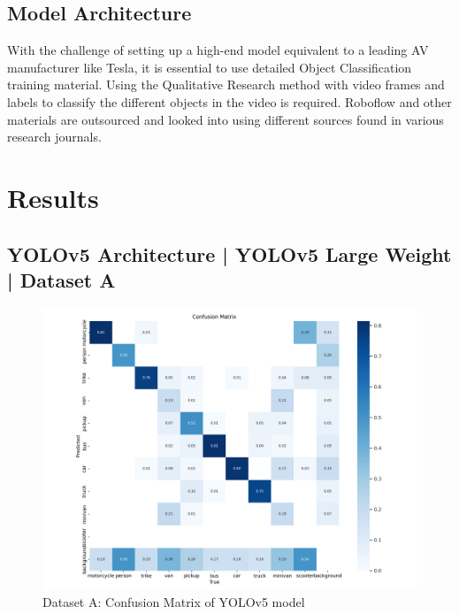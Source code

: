 \documentclass[conference]{IEEEtran}
\begin{document}
	\subsection{Model Architecture}
		With the challenge of setting up a high-end model equivalent to a leading AV manufacturer like Tesla, it is essential to use detailed Object Classification training material. Using the Qualitative Research method with video frames and labels to classify the different objects in the video is required. Roboflow and other materials are outsourced and looked into using different sources found in various research journals.

\section{Results}
	\subsection{YOLOv5 Architecture | YOLOv5 Large Weight | Dataset A}
		\begin{figure}[h]
			\centering
			\includegraphics[width=\columnwidth]{Figures/a_confusion_matrix.png}
			\caption{Dataset A: Confusion Matrix of YOLOv5 model}
			\label{fig:ukDatasetYolov5LargeWeight}
		\end{figure}
\end{document}
